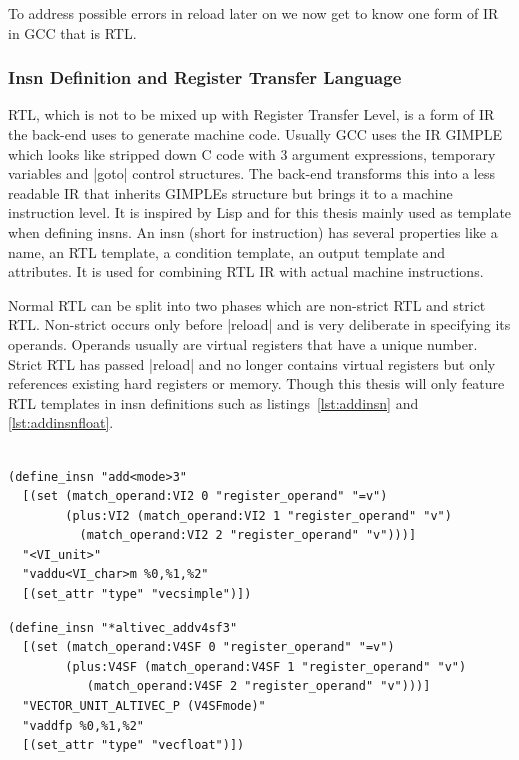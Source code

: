 {To address possible errors in reload later on we now get to know one form of \ac{IR} in \ac{GCC} that is \ac{RTL}.

\subsubsection{Insn Definition and Register Transfer Language}
\label{sec:defineinsn}
\acf{RTL}, which is not to be mixed up with Register Transfer Level, is a form of \ac{IR} the back-end uses to generate machine code.
Usually \ac{GCC} uses the \ac{IR} GIMPLE which looks like stripped down C code with 3 argument expressions, temporary variables and |goto| control structures.
The back-end transforms this into a less readable \ac{IR} that inherits GIMPLEs structure but brings it to a machine instruction level.
It is inspired by Lisp and for this thesis mainly used as template when defining insns.
An insn (short for instruction) has several properties like a name, an \ac{RTL} template, a condition template, an output template and attributes. \cite{GCCint:defineinsn}
It is used for combining \ac{RTL} \ac{IR} with actual machine instructions.

Normal \ac{RTL} can be split into two phases which are non-strict \ac{RTL} and strict \ac{RTL}.
Non-strict occurs only before |reload| and is very deliberate in specifying its operands.
Operands usually are virtual registers that have a unique number.
Strict \ac{RTL} has passed |reload| and no longer contains virtual registers but only references existing hard registers or memory.
Though this thesis will only feature \ac{RTL} templates in insn definitions such as listings~\ref{lst:addinsn} and \ref{lst:addinsnfloat}.
\\
\\
\begin{lstlisting}[caption=Definition of Unspecific add Insn, label=lst:addinsn, float, floatplacement=htbp]
(define_insn "add<mode>3"
  [(set (match_operand:VI2 0 "register_operand" "=v")
        (plus:VI2 (match_operand:VI2 1 "register_operand" "v")
		  (match_operand:VI2 2 "register_operand" "v")))]
  "<VI_unit>"
  "vaddu<VI_char>m %0,%1,%2"
  [(set_attr "type" "vecsimple")])
\end{lstlisting}

\begin{lstlisting}[caption=Definition of Specific add Insn, label=lst:addinsnfloat, float, floatplacement=htbp]
(define_insn "*altivec_addv4sf3"
  [(set (match_operand:V4SF 0 "register_operand" "=v")
        (plus:V4SF (match_operand:V4SF 1 "register_operand" "v")
		   (match_operand:V4SF 2 "register_operand" "v")))]
  "VECTOR_UNIT_ALTIVEC_P (V4SFmode)"
  "vaddfp %0,%1,%2"
  [(set_attr "type" "vecfloat")])
\end{lstlisting}

}
